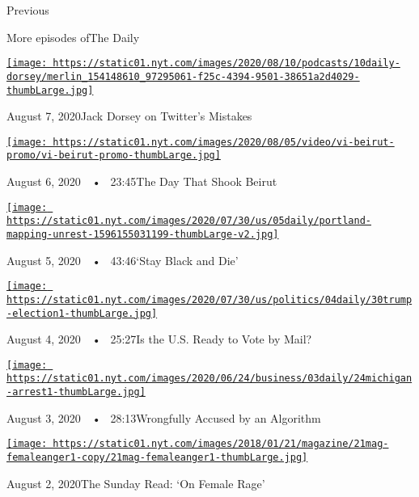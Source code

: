 Previous

More episodes ofThe Daily

\href{https://www.nytimes.com/2020/08/07/podcasts/the-daily/Jack-dorsey-twitter-trump.html?action=click\&module=audio-series-bar\&region=header\&pgtype=Article}{\texttt{[image: https://static01.nyt.com/images/2020/08/10/podcasts/10daily-dorsey/merlin\_154148610\_97295061-f25c-4394-9501-38651a2d4029-thumbLarge.jpg]}}

August 7, 2020Jack Dorsey on Twitter's Mistakes

\href{https://www.nytimes.com/2020/08/06/podcasts/the-daily/beirut-explosion-damage.html?action=click\&module=audio-series-bar\&region=header\&pgtype=Article}{\texttt{[image: https://static01.nyt.com/images/2020/08/05/video/vi-beirut-promo/vi-beirut-promo-thumbLarge.jpg]}}

August 6, 2020~~•~ 23:45The Day That Shook Beirut

\href{https://www.nytimes.com/2020/08/05/podcasts/the-daily/protests-racism-police-brutality.html?action=click\&module=audio-series-bar\&region=header\&pgtype=Article}{\texttt{[image: https://static01.nyt.com/images/2020/07/30/us/05daily/portland-mapping-unrest-1596155031199-thumbLarge-v2.jpg]}}

August 5, 2020~~•~ 43:46`Stay Black and Die'

\href{https://www.nytimes.com/2020/08/04/podcasts/the-daily/mail-in-voting-president-trump.html?action=click\&module=audio-series-bar\&region=header\&pgtype=Article}{\texttt{[image: https://static01.nyt.com/images/2020/07/30/us/politics/04daily/30trump-election1-thumbLarge.jpg]}}

August 4, 2020~~•~ 25:27Is the U.S. Ready to Vote by Mail?

\href{https://www.nytimes.com/2020/08/03/podcasts/the-daily/algorithmic-justice-racism.html?action=click\&module=audio-series-bar\&region=header\&pgtype=Article}{\texttt{[image: https://static01.nyt.com/images/2020/06/24/business/03daily/24michigan-arrest1-thumbLarge.jpg]}}

August 3, 2020~~•~ 28:13Wrongfully Accused by an Algorithm

\href{https://www.nytimes.com/2020/08/02/podcasts/the-daily/on-female-rage.html?action=click\&module=audio-series-bar\&region=header\&pgtype=Article}{\texttt{[image: https://static01.nyt.com/images/2018/01/21/magazine/21mag-femaleanger1-copy/21mag-femaleanger1-thumbLarge.jpg]}}

August 2, 2020The Sunday Read: `On Female Rage'

